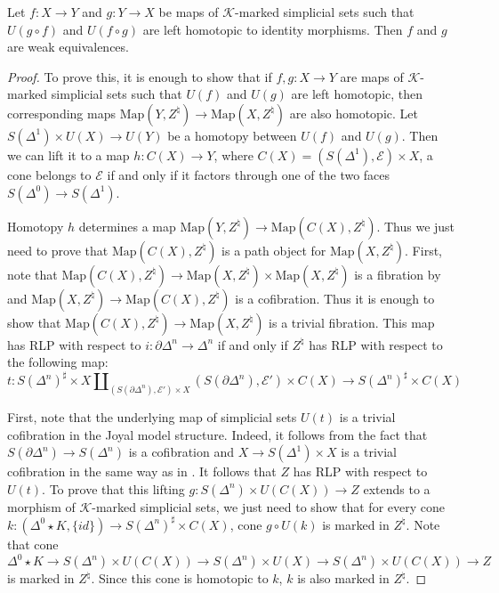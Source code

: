 \documentclass[reqno]{amsart}
\theoremstyle{definition}
\theoremstyle{remark}
\newcommand{\K}{$\mathcal{K}$}
\newcommand{\join}{\star}
\newcommand{\Map}{\mathrm{Map}}
\numberwithin{figure}{section}
\begin{document}
\begin{prop}[hom-we]
Let $f : X \to Y$ and $g : Y \to X$ be maps of \K-marked simplicial sets such that $U(g \circ f)$ and $U(f \circ g)$ are left homotopic to identity morphisms.
Then $f$ and $g$ are weak equivalences.
\end{prop}
\begin{proof}
To prove this, it is enough to show that if $f,g : X \to Y$ are maps of \K-marked simplicial sets such that $U(f)$ and $U(g)$ are left homotopic,
then corresponding maps $\Map(Y,Z^\natural) \to \Map(X,Z^\natural)$ are also homotopic.
Let $S(\Delta^1) \times U(X) \to U(Y)$ be a homotopy between $U(f)$ and $U(g)$.
Then we can lift it to a map $h : C(X) \to Y$, where $C(X) = (S(\Delta^1),\mathcal{E}) \times X$,
a cone belongs to $\mathcal{E}$ if and only if it factors through one of the two faces $S(\Delta^0) \to S(\Delta^1)$.

Homotopy $h$ determines a map $\Map(Y,Z^\natural) \to \Map(C(X),Z^\natural)$.
Thus we just need to prove that $\Map(C(X),Z^\natural)$ is a path object for $\Map(X,Z^\natural)$.
First, note that $\Map(C(X),Z^\natural) \to \Map(X,Z^\natural) \times \Map(X,Z^\natural)$ is a fibration by  and $\Map(X,Z^\natural) \to \Map(C(X),Z^\natural)$ is a cofibration.
Thus it is enough to show that $\Map(C(X),Z^\natural) \to \Map(X,Z^\natural)$ is a trivial fibration.
This map has RLP with respect to $i : \partial \Delta^n \to \Delta^n$ if and only if $Z^\natural$ has RLP with respect to the following map:
\[ t : S(\Delta^n)^\sharp \times X \amalg_{(S(\partial \Delta^n),\mathcal{E'}) \times X} (S(\partial \Delta^n),\mathcal{E'}) \times C(X) \to S(\Delta^n)^\sharp \times C(X) \]

First, note that the underlying map of simplicial sets $U(t)$ is a trivial cofibration in the Joyal model structure.
Indeed, it follows from the fact that $S(\partial \Delta^n) \to S(\Delta^n)$ is a cofibration and $X \to S(\Delta^1) \times X$ is a trivial cofibration in the same way as in .
It follows that $Z$ has RLP with respect to $U(t)$.
To prove that this lifting $g : S(\Delta^n) \times U(C(X)) \to Z$ extends to a morphism of \K-marked simplicial sets,
we just need to show that for every cone $k : (\Delta^0 \join K, \{id\}) \to S(\Delta^n)^\sharp \times C(X)$, cone $g \circ U(k)$ is marked in $Z^\natural$.
Note that cone $\Delta^0 \join K \to S(\Delta^n) \times U(C(X)) \to S(\Delta^n) \times U(X) \to S(\Delta^n) \times U(C(X)) \to Z$ is marked in $Z^\natural$.
Since this cone is homotopic to $k$, $k$ is also marked in $Z^\natural$.
\end{proof}
\end{document}

